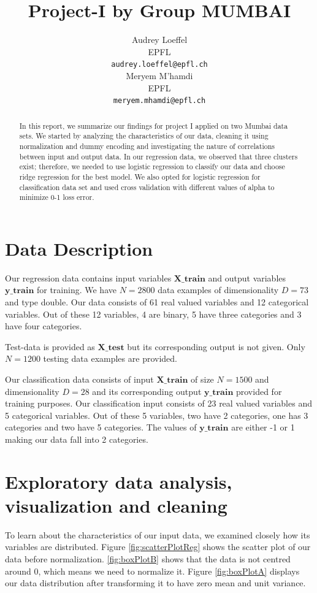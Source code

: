 \documentclass{article} %
\title{Project-I by Group MUMBAI}
\author{
Audrey Loeffel\\
EPFL \\
\texttt{audrey.loeffel@epfl.ch} \\
\And 
Meryem M'hamdi\\
EPFL \\
\texttt{meryem.mhamdi@epfl.ch} \\
}
\begin{document}
\maketitle

\begin{abstract} 
In this report, we summarize our findings for project I applied on two Mumbai data sets. We started by analyzing the characteristics of our data, cleaning it using normalization and dummy encoding and investigating the nature of correlations between input and output data. In our regression data, we observed that three clusters exist; therefore, we needed to use logistic regression to classify our data and choose ridge regression for the best model. We also opted for logistic regression for classification data set and used cross validation with different values of alpha to minimize 0-1 loss error. 

\end{abstract}

\section{Data Description}
Our regression data contains input variables $\mathbf{X\_train}$  and output variables $\mathbf{y\_train}$ for training. We have $N=2800$ data examples of dimensionality $D=73$ and type double. 
Our data consists of 61 real valued variables and 12 categorical variables. Out of these 12 variables, 4 are binary, 5 have three categories and 3 have four categories.

Test-data is provided as $\mathbf{X\_test}$ but its corresponding output is not given. Only $N=1200$ testing data examples are provided.

Our classification data consists of input $\mathbf{X\_train}$ of size $N=1500$ and dimensionality  $D=28$ and its corresponding output $\mathbf{y\_train}$ provided for training purposes. Our classification input consists of 23 real valued variables and 5 categorical variables. Out of these 5 variables, two have 2 categories, one has 3 categories and two have 5 categories. The values of $\mathbf{y\_train}$ are either -1 or 1 making our data fall into 2 categories. 

\section{Exploratory data analysis, visualization and cleaning}

To learn about the characteristics of our input data, we examined closely how its variables are distributed. Figure \ref{fig:scatterPlotReg} shows the scatter plot of our data before normalization. \ref{fig:boxPlotB} shows that the data is not centred around 0, which means we need to normalize it. Figure \ref{fig:boxPlotA} displays our data distribution after transforming it to have zero mean and unit variance. 
\end{document}
